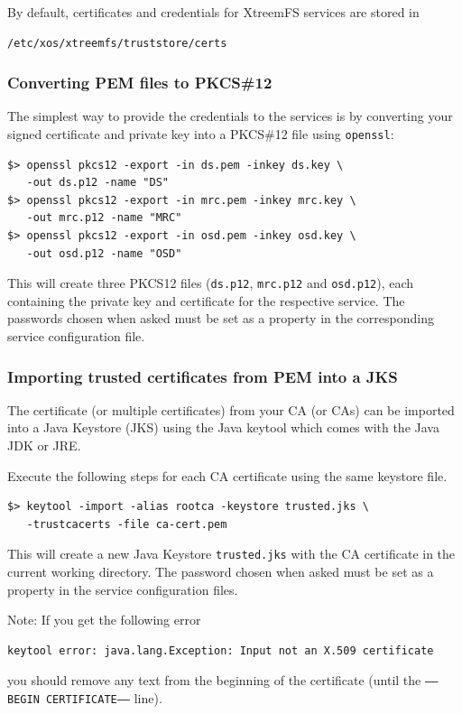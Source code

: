 \documentclass[a4paper,10pt]{book}
\begin{document}
By default, certificates and credentials for XtreemFS services are stored in
\begin{verbatim}
/etc/xos/xtreemfs/truststore/certs
\end{verbatim}


\subsubsection{Converting PEM files to PKCS\#12}
The simplest way to provide the credentials to the services is by converting your signed certificate and private key into a PKCS\#12 file using \texttt{openssl}:


\begin{verbatim}
$> openssl pkcs12 -export -in ds.pem -inkey ds.key \
   -out ds.p12 -name "DS"
$> openssl pkcs12 -export -in mrc.pem -inkey mrc.key \
   -out mrc.p12 -name "MRC"
$> openssl pkcs12 -export -in osd.pem -inkey osd.key \
   -out osd.p12 -name "OSD"
\end{verbatim}


This will create three PKCS12 files (\texttt{ds.p12}, \texttt{mrc.p12} and \texttt{osd.p12}), each containing the private key and certificate for the respective service. The passwords chosen when asked must be set as a property in the corresponding service configuration file.


\subsubsection{Importing trusted certificates from PEM into a JKS}

The certificate (or multiple certificates) from your CA (or CAs) can be imported into a Java Keystore (JKS)  using the Java keytool which comes with the Java JDK or JRE.

Execute the following steps for each CA certificate using the same keystore file.


\begin{verbatim}
$> keytool -import -alias rootca -keystore trusted.jks \
   -trustcacerts -file ca-cert.pem
\end{verbatim}


This will create a new Java Keystore \texttt{trusted.jks} with the CA certificate in the current working directory. The password chosen when asked must be set as a property in the service configuration files.

Note: If you get the following error
\begin{verbatim}
keytool error: java.lang.Exception: Input not an X.509 certificate
\end{verbatim}
you should remove any text from the beginning of the certificate (until the \texttt{-----BEGIN CERTIFICATE-----} line).
\end{document}
